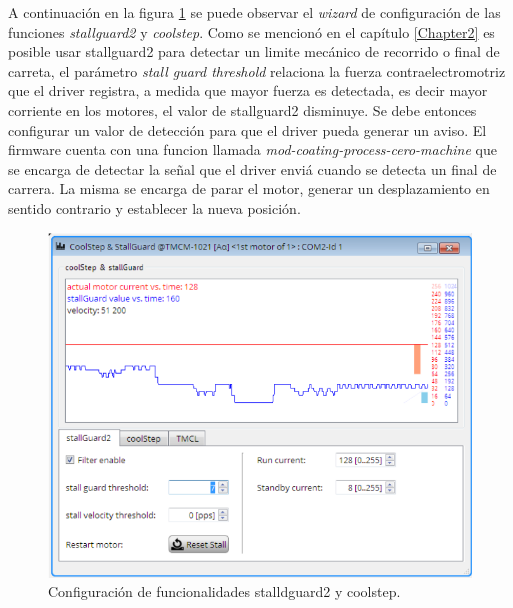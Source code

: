 A continuación en la figura \ref{fig:tmcl_ide_stall} se puede observar el \textit{wizard} de configuración de las funciones \textit{stallguard2} y \textit{coolstep}.
Como se mencionó en el capítulo \ref{Chapter2} es posible usar stallguard2 para detectar un limite mecánico de recorrido o final de carreta, el parámetro \textit{stall guard threshold} relaciona la fuerza contraelectromotriz que el driver registra, a medida que mayor fuerza es detectada, es decir mayor corriente en los motores, el valor de stallguard2 disminuye. Se debe entonces configurar un valor de detección para que el driver pueda generar un aviso.
El firmware cuenta con una funcion llamada \textit{mod-coating-process-cero-machine} que se encarga de detectar la señal que el driver enviá cuando se detecta un final de carrera. La misma se encarga de parar el motor, generar un desplazamiento en sentido contrario y establecer la nueva posición.

  

\begin{figure}[h!t]
	\centering
	\includegraphics[width=1\textwidth]{./Figures/tmcl_ide_2.png}
	\caption{Configuración de funcionalidades stalldguard2 y coolstep.}
	\label{fig:tmcl_ide_stall}
\end{figure}

